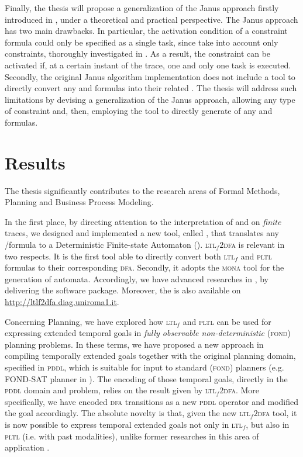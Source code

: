 Finally, the thesis will propose a generalization of the Janus approach firstly introduced in \cite{cecconi2018interestingness}, under a theoretical and practical perspective. The Janus approach has two main drawbacks. In particular, the activation condition of a constraint formula could only be specified as a single task, since \cite{cecconi2018interestingness} take into account only \declare constraints, thoroughly investigated in \cite{pesic2008constraint}. As a result, the constraint can be activated if, at a certain instant of the trace, one and only one task is executed. Secondly, the original Janus algorithm implementation does not include a tool to directly convert any \LTLf and \PLTL formulas into their related \DFAs. The thesis will address such limitations by devising a generalization of the Janus approach, allowing any type of constraint and, then, employing the \LTLfToDFA tool to directly generate \DFA of any \LTLf and \PLTL formulas.
\section{Results}
The thesis significantly contributes to the research areas of Formal Methods, Planning and Business Process Modeling. 

In the first place, by directing attention to the interpretation of \LTL and \PLTL on \textit{finite} traces, we designed and implemented a new tool, called \LTLfToDFA, that translates any \LTLf/\PLTL formula to a Deterministic Finite-state Automaton (\DFA). \textsc{ltl}$_f2$\textsc{dfa} is relevant in two respects. It is the first tool able to directly convert both \textsc{ltl}$_f$ and \textsc{pltl} formulas to their corresponding \textsc{dfa}. Secondly, it adopts the \textsc{mona} tool for the generation of automata. Accordingly, we have advanced researches in \cite{zhu2017symbolic,zpv2018}, by delivering the \LTLfToDFA software package. Moreover, the \LTLfToDFA is also available on \href{http://ltlf2dfa.diag.uniroma1.it}{http://ltlf2dfa.diag.uniroma1.it}.

Concerning Planning, we have explored how \textsc{ltl}$_f$ and \textsc{pltl} can be used for expressing extended temporal goals in \textit{fully observable non-deterministic} (\textsc{fond}) planning problems. In these terms, we have proposed a new approach in compiling temporally extended goals together with the original planning domain, specified in \textsc{pddl}, which is suitable for input to standard (\textsc{fond}) planners (e.g. FOND-SAT planner in \cite{geffner2018compact}).
The encoding of those temporal goals, directly in the \textsc{pddl} domain and problem, relies on the result given by \textsc{ltl}$_f2$\textsc{dfa}. More specifically, we have encoded \textsc{dfa} transitions as a new \textsc{pddl} operator and modified the goal accordingly. The absolute novelty is that, given the new \textsc{ltl}$_f2$\textsc{dfa} tool, it is now possible to express temporal extended goals not only in \textsc{ltl}$_f$, but also in \textsc{pltl} (i.e. with past modalities), unlike  former researches in this area of application \citep{camacho2017non, camacho2018finite, camacho2018ltl}.

